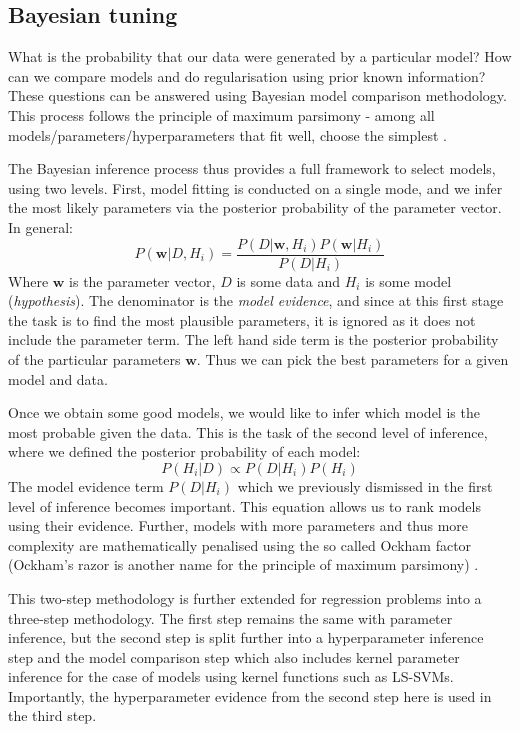 \documentclass[10pt,a4paper]{article}
\begin{document}
\subsection{Bayesian tuning}
What is the probability that our data were generated by a particular model? How can we compare models and do regularisation using prior known information? These questions can be answered using Bayesian model comparison methodology. This process follows the principle of maximum parsimony - among all models/parameters/hyperparameters that fit well, choose the simplest \cite{MacKay91bayesianinterpolation}.

The Bayesian inference process thus provides a full framework to select models, using two levels. First, model fitting is conducted on a single mode, and we infer the most likely parameters via the posterior probability of the parameter vector. In general:
$$
P(\mathbf{w} | D, H_i) = \frac{P(D | \mathbf{w}, H_i)P(\mathbf{w} | H_i)}{P(D | H_i)}
$$
Where $\mathbf{w}$ is the parameter vector, $D$ is some data and $H_i$ is some model (\textit{hypothesis}). The denominator is the \textit{model evidence}, and since at this first stage the task is to find the most plausible parameters, it is ignored as it does not include the parameter term. The left hand side term is the posterior probability of the particular parameters $\mathbf{w}$. Thus we can pick the best parameters for a given model and data.

Once we obtain some good models, we would like to infer which model is the most probable given the data. This is the task of the second level of inference, where we defined the posterior probability of each model:
$$
P(H_i | D) \propto P(D | H_i)P(H_i)
$$
The model evidence term $P(D | H_i)$ which we previously dismissed in the first level of inference becomes important. This equation allows us to rank models using their evidence. Further, models with more parameters and thus more complexity are mathematically penalised using the so called Ockham factor (Ockham's razor is another name for the principle of maximum parsimony) \cite{MacKay91bayesianinterpolation}.

This two-step methodology is further extended for regression problems into a three-step methodology. The first step remains the same with parameter inference, but the second step is split further into a hyperparameter inference step and the model comparison step which also includes kernel parameter inference for the case of models using kernel functions such as LS-SVMs. Importantly, the hyperparameter evidence from the second step here is used in the third step. 
\end{document}
